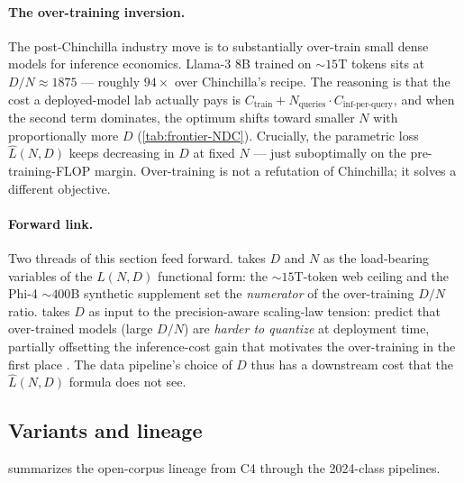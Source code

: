 \paragraph{The over-training inversion.}
The post-Chinchilla industry move is to substantially over-train
small dense models for inference economics. Llama-3 8B trained on
$\sim\!15$T tokens \citep{meta-llama3} sits at $D / N \approx 1875$
--- roughly $94\times$ over Chinchilla's recipe. The reasoning is
that the cost a deployed-model lab actually pays is
$C_{\text{train}} + N_{\text{queries}} \cdot C_{\text{inf-per-query}}$,
and when the second term dominates, the optimum shifts toward
smaller $N$ with proportionally more $D$
(\cref{tab:frontier-NDC}). Crucially, the parametric loss
$\hat{L}(N, D)$ keeps decreasing in $D$ at fixed $N$ --- just
suboptimally on the pre-training-FLOP margin. Over-training is not
a refutation of Chinchilla; it solves a different objective.

\paragraph{Forward link.}
Two threads of this section feed forward. 
takes $D$ and $N$ as the load-bearing variables of the
$L(N, D)$ functional form: the  $\sim 15$T-token web
ceiling and the Phi-4 $\sim 400$B synthetic supplement set the
\emph{numerator} of the over-training $D / N$ ratio.
 takes $D$ as input to the
precision-aware scaling-law tension: \citet{scaling-laws-precision-2024}
predict that over-trained models (large $D / N$) are
\emph{harder to quantize} at deployment time, partially offsetting
the inference-cost gain that motivates the over-training in the
first place \citep[\S 4]{scaling-laws-precision-2024}. The data
pipeline's choice of $D$ thus has a downstream cost that the
$\hat{L}(N, D)$ formula does not see.

\subsection{Variants and lineage}
\label{sec:data-lineage}

 summarizes the open-corpus lineage from C4
through the 2024-class pipelines.

